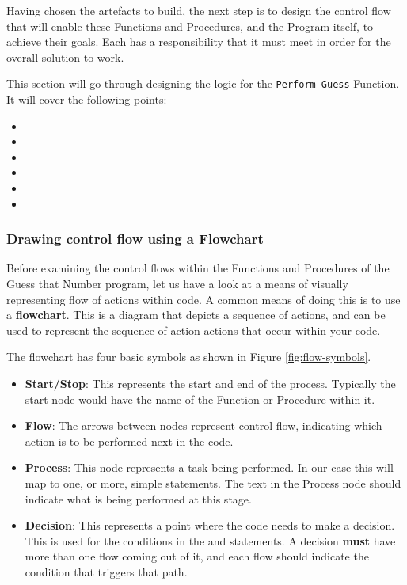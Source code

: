 Having chosen the artefacts to build, the next step is to design the control flow that will enable these Functions and Procedures, and the Program itself, to achieve their goals. Each has a responsibility that it must meet in order for the overall solution to work. 

This section will go through designing the logic for the \texttt{Perform Guess} Function. It will cover the following points: 
\begin{itemize}
  \item {}
  \item {}
  \item {}
  \item {}
  \item {}
  \item {}
\end{itemize}

\subsubsection{Drawing control flow using a Flowchart} %
\label{ssub:flow_charts}

Before examining the control flows within the Functions and Procedures of the Guess that Number program, let us have a look at a means of visually representing flow of actions within code. A common means of doing this is to use a \textbf{flowchart}. This is a diagram that depicts a sequence of actions, and can be used to represent the sequence of action actions that occur within your code.

The flowchart has four basic symbols as shown in Figure \ref{fig:flow-symbols}.
\begin{itemize}
  \item \textbf{Start/Stop}: This represents the start and end of the process. Typically the start node would have the name of the Function or Procedure within it.
  \item \textbf{Flow}: The arrows between nodes represent control flow, indicating which action is to be performed next in the code.
  \item \textbf{Process}: This node represents a task being performed. In our case this will map to one, or more, simple statements. The text in the Process node should indicate what is being performed at this stage.
  \item \textbf{Decision}: This represents a point where the code needs to make a decision. This is used for the conditions in the  and  statements. A decision \textbf{must} have more than one flow coming out of it, and each flow should indicate the condition that triggers that path.
\end{itemize}

